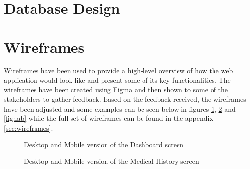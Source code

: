 \FloatBarrier

\noindent\begin{minipage}{\textwidth}
    \section{Database Design}
    \begin{center}
        \label{fig:erd}
    \end{center}
\end{minipage}

\FloatBarrier

\section{Wireframes}

Wireframes have been used to provide a high-level overview of how the web application would look like and present some of its key functionalities. The wireframes have been created using Figma and then shown to some of the stakeholders to gather feedback. Based on the feedback received, the wireframes have been adjusted and some examples can be seen below in figures \ref{fig:dashboard}, \ref{fig:medhistory} and \ref{fig:lab} while the full set of wireframes can be found in the appendix \ref{sec:wireframes}.

\begin{figure}[ht]
    \centering
    \hspace{0.05\textwidth} 
    \caption{Desktop and Mobile version of the Dashboard screen}
    \label{fig:dashboard}
\end{figure}

\begin{figure}[ht]
    \centering
    \hspace{0.05\textwidth} 
    \caption{Desktop and Mobile version of the Medical History screen}
    \label{fig:medhistory}
\end{figure}

